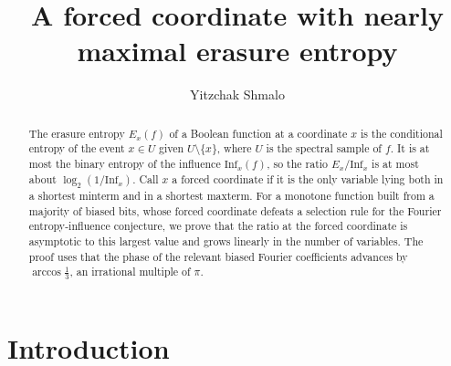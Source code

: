\documentclass[11pt]{amsart}
\title{A forced coordinate with nearly maximal erasure entropy}
\author{Yitzchak Shmalo}
\date{}
\theoremstyle{remark}
\newcommand{\Inf}{\mathrm{Inf}}
\begin{document}
\begin{abstract}
The erasure entropy $E_x(f)$ of a Boolean function at a coordinate $x$ is the conditional entropy of the event $x\in U$
given $U\setminus\{x\}$, where $U$ is the spectral sample of $f$. It is at most the binary entropy of the influence
$\Inf_x(f)$, so the ratio $E_x/\Inf_x$ is at most about $\log_2(1/\Inf_x)$. Call $x$ a forced coordinate if it is the
only variable lying both in a shortest minterm and in a shortest maxterm. For a monotone function built from a
majority of biased bits, whose forced coordinate defeats a selection rule for the Fourier entropy-influence
conjecture, we prove that the ratio at the forced coordinate is asymptotic to this largest value and grows linearly in
the number of variables. The proof uses that the phase of the relevant biased Fourier coefficients advances by
$\arccos\frac13$, an irrational multiple of $\pi$.
\end{abstract}


\maketitle
\enlargethispage{2pt}

\section{Introduction}\label{sec:intro}
\end{document}

